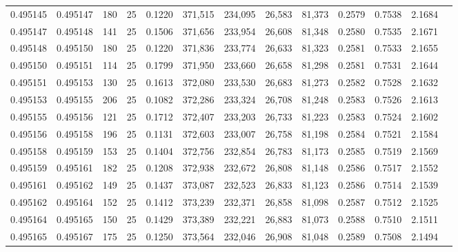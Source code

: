 \begin{tabular}{rrrrrrrrrrrrr}
0.495145 & 0.495147 &   180 &  25 &                                     0.1220 & 371,515 & 234,095 &  26,583 &  81,373 & 0.2579 & 0.7538 & 2.1684 \\
0.495147 & 0.495148 &   141 &  25 &                                     0.1506 & 371,656 & 233,954 &  26,608 &  81,348 & 0.2580 & 0.7535 & 2.1671 \\
0.495148 & 0.495150 &   180 &  25 &                                     0.1220 & 371,836 & 233,774 &  26,633 &  81,323 & 0.2581 & 0.7533 & 2.1655 \\
0.495150 & 0.495151 &   114 &  25 &                                     0.1799 & 371,950 & 233,660 &  26,658 &  81,298 & 0.2581 & 0.7531 & 2.1644 \\
0.495151 & 0.495153 &   130 &  25 &                                     0.1613 & 372,080 & 233,530 &  26,683 &  81,273 & 0.2582 & 0.7528 & 2.1632 \\
0.495153 & 0.495155 &   206 &  25 &                                     0.1082 & 372,286 & 233,324 &  26,708 &  81,248 & 0.2583 & 0.7526 & 2.1613 \\
0.495155 & 0.495156 &   121 &  25 &                                     0.1712 & 372,407 & 233,203 &  26,733 &  81,223 & 0.2583 & 0.7524 & 2.1602 \\
0.495156 & 0.495158 &   196 &  25 &                                     0.1131 & 372,603 & 233,007 &  26,758 &  81,198 & 0.2584 & 0.7521 & 2.1584 \\
0.495158 & 0.495159 &   153 &  25 &                                     0.1404 & 372,756 & 232,854 &  26,783 &  81,173 & 0.2585 & 0.7519 & 2.1569 \\
0.495159 & 0.495161 &   182 &  25 &                                     0.1208 & 372,938 & 232,672 &  26,808 &  81,148 & 0.2586 & 0.7517 & 2.1552 \\
0.495161 & 0.495162 &   149 &  25 &                                     0.1437 & 373,087 & 232,523 &  26,833 &  81,123 & 0.2586 & 0.7514 & 2.1539 \\
0.495162 & 0.495164 &   152 &  25 &                                     0.1412 & 373,239 & 232,371 &  26,858 &  81,098 & 0.2587 & 0.7512 & 2.1525 \\
0.495164 & 0.495165 &   150 &  25 &                                     0.1429 & 373,389 & 232,221 &  26,883 &  81,073 & 0.2588 & 0.7510 & 2.1511 \\
0.495165 & 0.495167 &   175 &  25 &                                     0.1250 & 373,564 & 232,046 &  26,908 &  81,048 & 0.2589 & 0.7508 & 2.1494 \\

\end{tabular}
